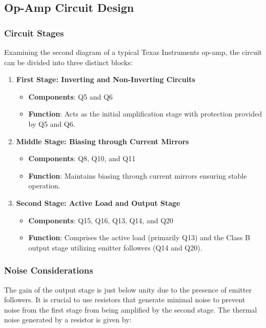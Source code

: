 \documentclass[a4paper,9pt,twoside,openany,twocolumn]{memoir}
\begin{document}
\subsection{Op-Amp Circuit Design}

\subsubsection{Circuit Stages}

Examining the second diagram of a typical Texas Instruments op-amp, the circuit can be divided into three distinct blocks:

\begin{enumerate}
    \item \textbf{First Stage: Inverting and Non-Inverting Circuits}
    \begin{itemize}
        \item \textbf{Components}: Q5 and Q6
        \item \textbf{Function}: Acts as the initial amplification stage with protection provided by Q5 and Q6.
    \end{itemize}

    \item \textbf{Middle Stage: Biasing through Current Mirrors}
    \begin{itemize}
        \item \textbf{Components}: Q8, Q10, and Q11
        \item \textbf{Function}: Maintains biasing through current mirrors ensuring stable operation.
    \end{itemize}

    \item \textbf{Second Stage: Active Load and Output Stage}
    \begin{itemize}
        \item \textbf{Components}: Q15, Q16, Q13, Q14, and Q20
        \item \textbf{Function}: Comprises the active load (primarily Q13) and the Class B output stage utilizing emitter followers (Q14 and Q20).
    \end{itemize}
\end{enumerate}

\subsubsection{Noise Considerations}

The gain of the output stage is just below unity due to the presence of emitter followers. It is crucial to use resistors that generate minimal noise to prevent noise from the first stage from being amplified by the second stage. The thermal noise generated by a resistor is given by:
\end{document}
